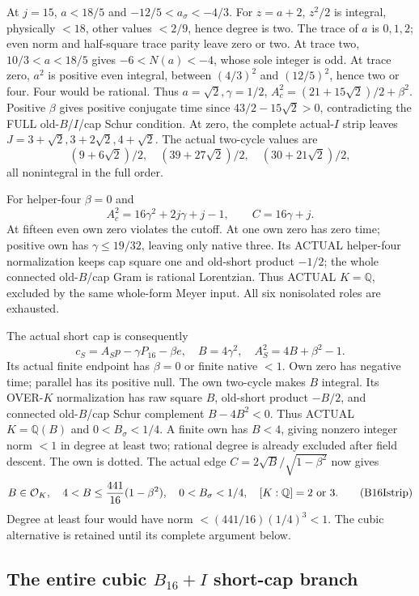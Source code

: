 \documentclass[11pt]{article}
\begin{document}
At \(j=15\), \(a<18/5\) and
\(-12/5<a_\sigma<-4/3\).
For \(z=a+2\), \(z^2/2\) is integral,
physically \(<18\), other values
\(<2/9\), hence degree is two.
The trace of \(a\) is \(0,1,2\);
even norm and half-square trace parity
leave zero or two.
At trace two, \(10/3<a<18/5\)
gives \(-6<N(a)<-4\), whose sole
integer is odd.
At trace zero, \(a^2\) is positive
even integral, between \((4/3)^2\)
and \((12/5)^2\), hence two or four.
Four would be rational.
Thus \(a=\sqrt2,\gamma=1/2\),
\(A_c^2=(21+15\sqrt2)/2+\beta^2\).
Positive \(\beta\) gives positive
conjugate time since
\(43/2-15\sqrt2>0\), contradicting
the FULL old-\(B\)/\(I\)/cap Schur condition.
At zero, the complete actual-\(I\) strip
leaves \(J=3+\sqrt2,3+2\sqrt2,4+\sqrt2\).
The actual two-cycle values are
\[
                  (9+6\sqrt2)/2,\quad(39+27\sqrt2)/2,\quad
                                           (30+21\sqrt2)/2 ,
\]
all nonintegral in the full order.

For helper-four \(\beta=0\) and
\[
                 A_c^2=16\gamma^2+2j\gamma+j-1,\qquad C=16\gamma+j .
\]
At fifteen even own zero violates the
cutoff.
At one own zero has zero time;
positive own has \(\gamma\le19/32\),
leaving only native three.
Its ACTUAL helper-four normalization
keeps cap square one and old-short
product \(-1/2\); the whole connected
old-\(B\)/cap Gram is rational Lorentzian.
Thus ACTUAL \(K=\mathbb Q\), excluded
by the same whole-form Meyer input.
All six nonisolated roles are exhausted.

The actual short cap is consequently
\[
 c_S=A_Sp-\gamma P_{16}-\beta e,\quad
 B=4\gamma^2,\quad A_S^2=4B+\beta^2-1 .
\]
Its actual finite endpoint has
\(\beta=0\) or finite native \(<1\).
Own zero has negative time; parallel
has its positive null.
The own two-cycle makes \(B\) integral.
Its OVER-\(K\) normalization has raw
square \(B\), old-short product \(-B/2\),
and connected old-\(B\)/cap Schur
complement \(B-4B^2<0\).
Thus ACTUAL \(K=\mathbb Q(B)\) and
\(0<B_\sigma<1/4\).
A finite own has \(B<4\), giving
nonzero integer norm \(<1\) in degree
at least two; rational degree is already
excluded after field descent.
The own is dotted.
The actual edge
\(C=2\sqrt B/\sqrt{1-\beta^2}\) now gives
\[
 B\in\mathcal O_K,\quad4<B\le{441\over16}(1-\beta^2),\quad
 0<B_\sigma<1/4,\quad [K:\mathbb Q]=2\ \hbox{or }3 .
\tag{B16Istrip}\label{eq:arithB16Iisolatedstrip}
\]
Degree at least four would have norm
\(<(441/16)(1/4)^3<1\).
The cubic alternative is retained until
its complete argument below.

\subsection{The entire cubic \(B_{16}+I\) short-cap branch}
\label{app:arithB16Icubic}
\end{document}
